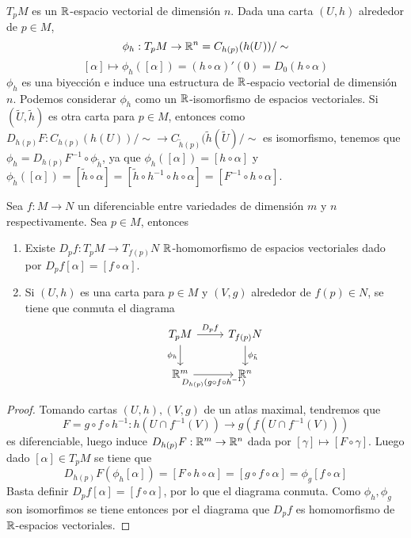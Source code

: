 \documentclass[CV.tex]{subfiles}
\begin{document}
\begin{nota}
\item $T_pM$ es un $\mathbb{R}$-espacio vectorial de dimensión $n$. Dada una carta $(U,h)$ alrededor de $p\in M$,
\[
\phi_h:T_pM\to \mathbb{R}^n=C_{h(p)}(h(U))/\sim 
\]
\[
[\alpha]\mapsto \phi_h([\alpha])=(h\circ\alpha)'(0)=D_0(h\circ\alpha)
\]
$\phi_h$ es una biyección e induce una estructura de $\mathbb{R}$-espacio vectorial de dimensión $n$. Podemos considerar $\phi_h$ como un $\mathbb{R}$-isomorfismo de espacios vectoriales. Si $(\widetilde{U},\tilde{h})$ es otra carta para $p\in M$, entonces como $D_{h(p)}F:C_{h(p)}(h(U))/\sim\to C_{\tilde{h}(p)}(\tilde{h}(\widetilde{U})/\sim$ es isomorfismo, tenemos que $\phi_h=D_{h(p)}F^{-1}\circ \phi_{\tilde{h}}$, ya que $\phi_h([\alpha])=[h\circ\alpha]$ y $\phi_{\tilde{h}}([\alpha])=[\tilde{h}\circ\alpha]=[\tilde{h} \circ h^{-1}\circ h\circ \alpha]=[F^{-1} \circ h \circ \alpha]$. 
\end{nota}

\begin{lemma}
Sea $f:M\to N$ un diferenciable entre variedades de dimensión $m$ y $n$ respectivamente. Sea $p\in M$, entonces
\begin{enumerate}
\item Existe $D_pf:T_pM\to T_{f(p)}N$ $\mathbb{R}$-homomorfismo de espacios vectoriales dado por $D_pf[\alpha]=[f\circ\alpha]$.
\item Si $(U,h)$ es una carta para $p\in M$ y $(V,g)$ alrededor de $f(p)\in N$, se tiene que conmuta el diagrama
\[
\begin{tikzcd}
T_pM\arrow[r, "D_pf"]\arrow[d, "\phi_h"'] & T_{f(p)}N\arrow[d, "\phi_{\tilde{h}}"]\\
\R^m\arrow[r, "D_{h(p)}(g\circ f\circ h^{-1})"'] & \R^n
\end{tikzcd}
\]
\end{enumerate}
\end{lemma}

\begin{proof}
 Tomando cartas $(U,h),(V,g)$ de un atlas maximal, tendremos que
\[
F=g\circ f\circ h^{-1}:h(U\cap f^{-1}(V))\to g(f(U\cap f^{-1}(V)))
\]
es diferenciable, luego induce $D_{h(p)}F:\mathbb{R}^m\to\mathbb{R}^n$  dada por $[\gamma]\mapsto[F\circ\gamma]$. Luego dado $[\alpha]\in T_pM$ se tiene que 
\[
D_{h(p)}F(\phi_h[\alpha])=[F\circ h\circ\alpha]=[g\circ f\circ \alpha]=\phi_g[f\circ\alpha]
\]
Basta definir $D_pf[\alpha]=[f\circ \alpha]$, por lo que el diagrama conmuta. Como $\phi_h,\phi_g$ son isomorfimos se tiene entonces por el diagrama que $D_pf$ es homomorfismo de $\mathbb{R}$-espacios vectoriales.
\end{proof}
\end{document}

